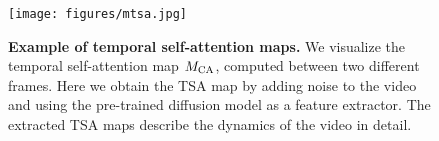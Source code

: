 \begin{figure}[t]
  \centering
  \texttt{[image: figures/mtsa.jpg]}
  \caption{{\bf Example of temporal self-attention maps.} We visualize the temporal self-attention map $M_{{\rm CA}}$, computed between two different frames. Here we obtain the TSA map by adding noise to the video and using the pre-trained diffusion model as a feature extractor. The extracted TSA maps describe the dynamics of the video in detail.}
  \label{fig:mtsa}
\end{figure}